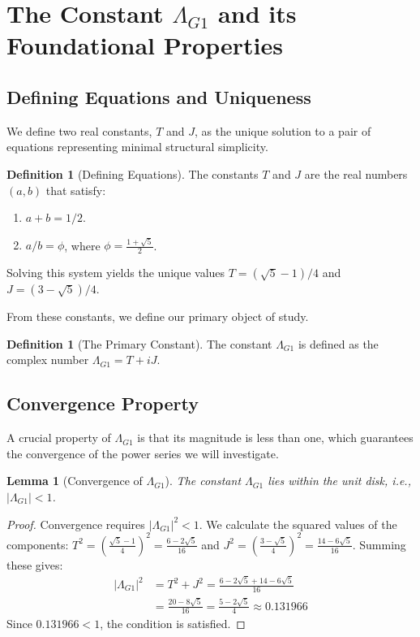 \documentclass{amsart}
\theoremstyle{plain}
\newtheorem{lemma}[theorem]{Lemma}
\theoremstyle{definition}
\newtheorem{definition}[theorem]{Definition}
\theoremstyle{remark}
\newcommand{\LambdaG}{\Lambda_{G1}}
\begin{document}
\section{The Constant \texorpdfstring{$\Lambda_{G1}$}{Lambda\_G1} and its Foundational Properties}

\subsection{Defining Equations and Uniqueness}
We define two real constants, $T$ and $J$, as the unique solution to a pair of equations representing minimal structural simplicity.

\begin{definition}[Defining Equations]
The constants $T$ and $J$ are the real numbers $(a,b)$ that satisfy:
\begin{enumerate}
    \item $a+b = 1/2$.
    \item $a/b = \phi$, where $\phi = \frac{1+\sqrt{5}}{2}$.
\end{enumerate}
Solving this system yields the unique values $T = (\sqrt{5}-1)/4$ and $J = (3-\sqrt{5})/4$.
\end{definition}

From these constants, we define our primary object of study.
\begin{definition}[The Primary Constant]
The constant $\LambdaG$ is defined as the complex number $\LambdaG = T+iJ$.
\end{definition}

\subsection{Convergence Property}
A crucial property of $\LambdaG$ is that its magnitude is less than one, which guarantees the convergence of the power series we will investigate.

\begin{lemma}[Convergence of $\LambdaG$]
\label{lem:convergence}
The constant $\LambdaG$ lies within the unit disk, i.e., $|\LambdaG| < 1$.
\end{lemma}
\begin{proof}
Convergence requires $|\LambdaG|^2 < 1$. We calculate the squared values of the components:
$T^2 = \left(\frac{\sqrt{5}-1}{4}\right)^2 = \frac{6-2\sqrt{5}}{16}$ and $J^2 = \left(\frac{3-\sqrt{5}}{4}\right)^2 = \frac{14-6\sqrt{5}}{16}$.
Summing these gives:
\begin{align*}
    |\LambdaG|^2 &= T^2+J^2 = \frac{6-2\sqrt{5} + 14-6\sqrt{5}}{16} \\
                 &= \frac{20-8\sqrt{5}}{16} = \frac{5-2\sqrt{5}}{4} \approx 0.131966
\end{align*}
Since $0.131966 < 1$, the condition is satisfied.
\end{proof}
\end{document}
